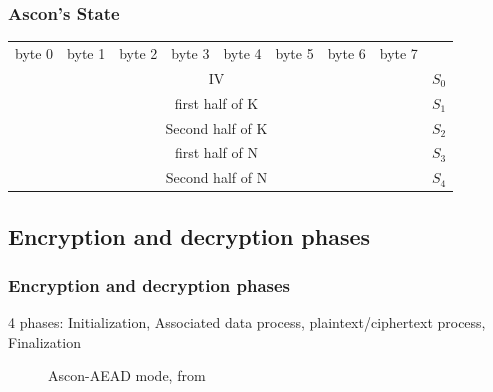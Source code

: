 \documentclass{beamer}
\begin{document}
	\begin{frame}
		\frametitle{Ascon's State}
		\begin{tabular}{|c|c|c|c|c|c|c|c|l}
			byte 0&byte 1&byte 2&byte 3&byte 4&byte 5&byte 6&byte 7&\\
			\cline{1-8}
			\multicolumn{8}{|c|}{IV}&$S_0$\\
			\cline{1-8}
			\multicolumn{8}{|c|}{first half of K}&$S_1$\\
			\cline{1-8}
			\multicolumn{8}{|c|}{Second half of K}&$S_2$\\
			\cline{1-8}
			\multicolumn{8}{|c|}{first half of N}&$S_3$\\
			\cline{1-8}
			\multicolumn{8}{|c|}{Second half of N}&$S_4$\\
			\cline{1-8}
		\end{tabular}
	\end{frame}
	
	\subsection{Encryption and decryption phases}
	\begin{frame}
		\frametitle{Encryption and decryption phases}
		
		4 phases: Initialization, Associated data process, plaintext/ciphertext process, Finalization
		
		\begin{figure}
			\centering
			\resizebox{350pt}{80pt}{
				
			}
			\caption{Ascon-AEAD mode, from \cite{cours_crypto}}
		\end{figure}	
	\end{frame}
	
\end{document}

